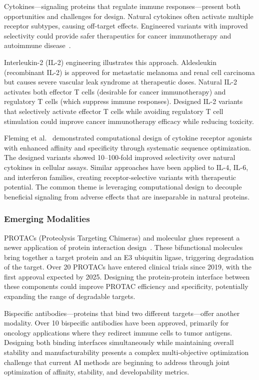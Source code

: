 Cytokines---signaling proteins that regulate immune responses---present both opportunities and challenges for design. Natural cytokines often activate multiple receptor subtypes, causing off-target effects. Engineered variants with improved selectivity could provide safer therapeutics for cancer immunotherapy and autoimmune disease~\cite{silva2020il2}.

Interleukin-2 (IL-2) engineering illustrates this approach. Aldesleukin (recombinant IL-2) is approved for metastatic melanoma and renal cell carcinoma but causes severe vascular leak syndrome at therapeutic doses. Natural IL-2 activates both effector T cells (desirable for cancer immunotherapy) and regulatory T cells (which suppress immune responses). Designed IL-2 variants that selectively activate effector T cells while avoiding regulatory T cell stimulation could improve cancer immunotherapy efficacy while reducing toxicity.

Fleming et al.~\cite{fleming2021computational} demonstrated computational design of cytokine receptor agonists with enhanced affinity and specificity through systematic sequence optimization. The designed variants showed 10--100-fold improved selectivity over natural cytokines in cellular assays. Similar approaches have been applied to IL-4, IL-6, and interferon families, creating receptor-selective variants with therapeutic potential. The common theme is leveraging computational design to decouple beneficial signaling from adverse effects that are inseparable in natural proteins.

\subsubsection{Emerging Modalities}

PROTACs (Proteolysis Targeting Chimeras) and molecular glues represent a newer application of protein interaction design~\cite{trepte2024ai}. These bifunctional molecules bring together a target protein and an E3 ubiquitin ligase, triggering degradation of the target. Over 20 PROTACs have entered clinical trials since 2019, with the first approval expected by 2025. Designing the protein-protein interface between these components could improve PROTAC efficiency and specificity, potentially expanding the range of degradable targets.

Bispecific antibodies---proteins that bind two different targets---offer another modality. Over 10 bispecific antibodies have been approved, primarily for oncology applications where they redirect immune cells to tumor antigens. Designing both binding interfaces simultaneously while maintaining overall stability and manufacturability presents a complex multi-objective optimization challenge that current AI methods are beginning to address through joint optimization of affinity, stability, and developability metrics.

